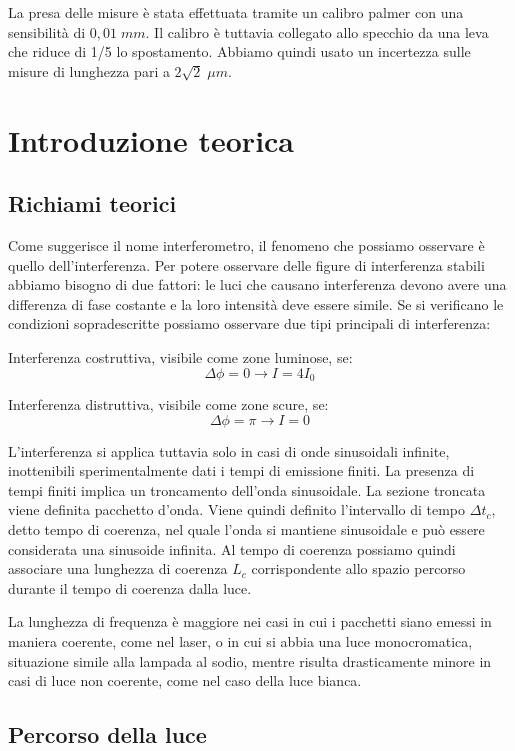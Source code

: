 \documentclass{article}
\begin{document}
La presa delle misure è stata effettuata tramite un calibro palmer con una sensibilità di $0,01 \; mm$. Il calibro è tuttavia collegato allo specchio da una leva che riduce di 1/5 lo spostamento. Abbiamo quindi usato un incertezza sulle misure di lunghezza pari a $2 \sqrt2 \; \mu m$.




\section{Introduzione teorica}
\subsection{Richiami teorici}
Come suggerisce il nome interferometro, il fenomeno che possiamo osservare è quello dell'interferenza. 
Per potere osservare delle figure di interferenza stabili abbiamo bisogno di due fattori: le luci che causano interferenza devono avere una differenza di fase costante e la loro intensità deve essere simile. Se si verificano le condizioni sopradescritte possiamo osservare due tipi principali di interferenza:

Interferenza costruttiva, visibile come zone luminose, se:
\[ \Delta \phi = 0 \rightarrow I = 4 I_0 \]

Interferenza distruttiva, visibile come zone scure, se: 
\[ \Delta \phi = \pi \rightarrow I = 0 \]

L'interferenza si applica tuttavia solo in casi di onde sinusoidali infinite, inottenibili sperimentalmente dati i tempi di emissione finiti. La presenza di tempi finiti implica un troncamento dell'onda sinusoidale. La sezione troncata viene definita pacchetto d'onda. Viene quindi definito l'intervallo di tempo $\Delta t_c$, detto tempo di coerenza, nel quale l'onda si mantiene sinusoidale e può essere considerata una sinusoide infinita. Al tempo di coerenza possiamo quindi associare una lunghezza di coerenza $L_c$ corrispondente allo spazio percorso durante il tempo di coerenza dalla luce.

La lunghezza di frequenza è maggiore nei casi in cui i pacchetti siano emessi in maniera coerente, come nel laser, o in cui si abbia una luce monocromatica, situazione simile alla lampada al sodio, mentre risulta drasticamente minore in casi di luce non coerente, come nel caso della luce bianca.


\subsection{Percorso della luce}
\end{document}
